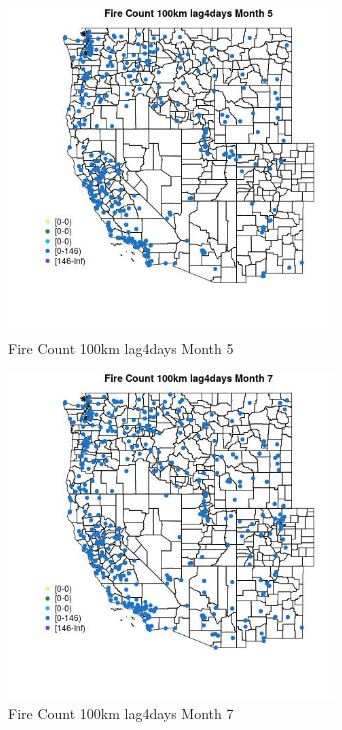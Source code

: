 \begin{figure} 
\centering  
\includegraphics[width=0.77\textwidth]{Code_Outputs/Report_ML_input_PM25_Step4_part_e_de_duplicated_aves_compiled_2019-05-18wNAs_MapObsMo5Fire_Count_100km_lag4days.jpg} 
\caption{\label{fig:Report_ML_input_PM25_Step4_part_e_de_duplicated_aves_compiled_2019-05-18wNAsMapObsMo5Fire_Count_100km_lag4days}Fire Count 100km lag4days Month 5} 
\end{figure} 
 

\begin{figure} 
\centering  
\includegraphics[width=0.77\textwidth]{Code_Outputs/Report_ML_input_PM25_Step4_part_e_de_duplicated_aves_compiled_2019-05-18wNAs_MapObsMo7Fire_Count_100km_lag4days.jpg} 
\caption{\label{fig:Report_ML_input_PM25_Step4_part_e_de_duplicated_aves_compiled_2019-05-18wNAsMapObsMo7Fire_Count_100km_lag4days}Fire Count 100km lag4days Month 7} 
\end{figure} 
 

